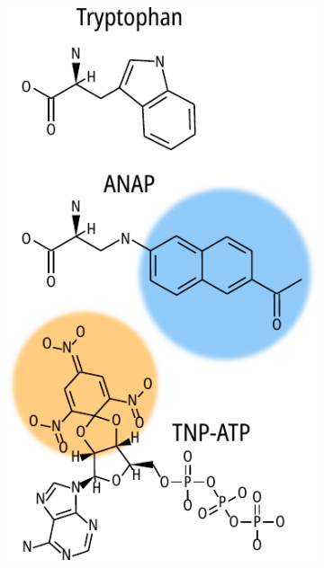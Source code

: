 \begin{figure}[hbtp]
	\centering
	\begin{subfigure}[t]{0.4\textwidth}
		\caption{}\label{ch3fig:chemical_structures}
		\centering
		\includegraphics[width=\textwidth]{chemical_structures.pdf}
	\end{subfigure}
	\hfill
	\parbox[t]{0.5\textwidth}{
	\begin{subfigure}[t]{0.5\textwidth}
		\caption{}\label{ch3fig:spectral_overlap}
		\centering

\end{subfigure}}
\end{figure}
